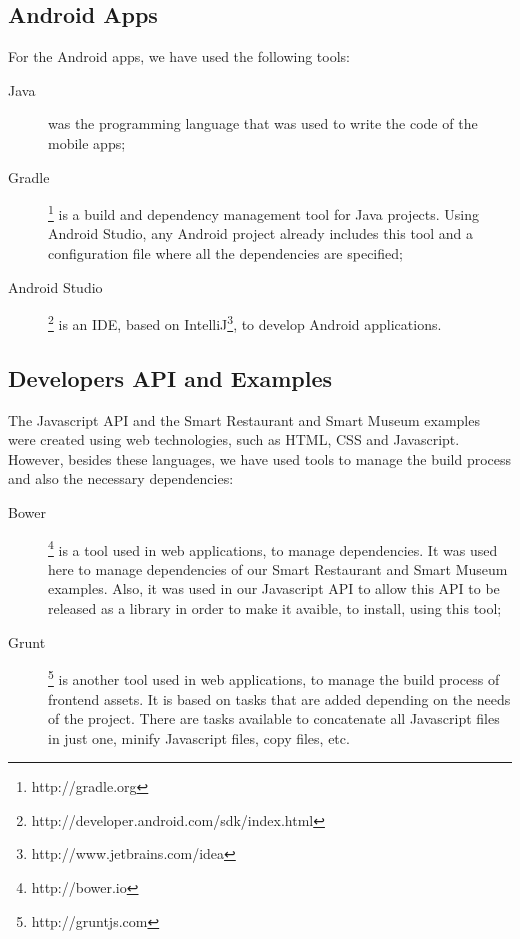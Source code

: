\subsection{Android Apps}
\label{sub:implementation_tools_android_apps}
For the Android apps, we have used the following tools:
\begin{description}
  \item[Java] was the programming language that was used to write the code of the mobile apps;
  \item[Gradle] \footnote{http://gradle.org} is a build and dependency management tool for Java projects. Using Android Studio, any Android project already includes this tool and a configuration file where all the dependencies are specified;
  \item[Android Studio] \footnote{http://developer.android.com/sdk/index.html} is an \gls{IDE}, based on IntelliJ\footnote{http://www.jetbrains.com/idea},
  to develop Android
  applications.
\end{description}

\subsection{Developers \gls{API} and Examples}
\label{sub:implementation_tools_developers_api_and_examples}
The Javascript \gls{API} and the Smart Restaurant and Smart Museum examples were created using web technologies, such as \gls{HTML}, \gls{CSS} and Javascript.
However, besides these languages, we have used tools to manage the build process and also the necessary dependencies:
\begin{description}
  \item[Bower]\footnote{http://bower.io} is a tool used in web applications, to manage dependencies. It was used here to manage dependencies of our Smart Restaurant and Smart Museum examples.
  Also, it was used in our Javascript \gls{API} to allow this \gls{API} to be released as a library in order to make it avaible, to install, using this tool;
  \item[Grunt]\footnote{http://gruntjs.com} is another tool used in web applications, to manage the build process of frontend assets.
  It is based on tasks that are added depending on the needs of the project.
  There are tasks available to concatenate all Javascript files in just one, minify Javascript files, copy files, etc.
\end{description}

